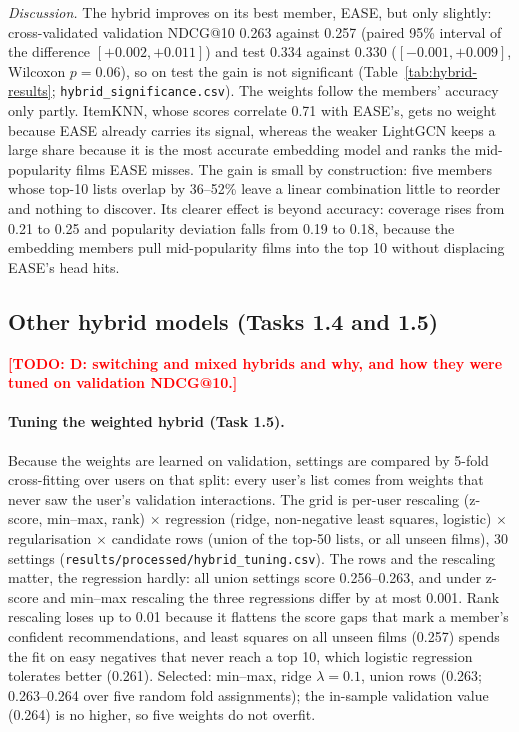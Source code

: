 \documentclass[12pt,a4paper]{article}
\newcommand{\TODO}[1]{\textcolor{red}{\textbf{[TODO: #1]}}}
\newcommand{\owner}[1]{\marginpar{\footnotesize\color{gray}#1}}   %
\begin{document}
\emph{Discussion.} The hybrid improves on its best member, EASE, but only slightly: cross-validated validation
NDCG@10 0.263 against 0.257 (paired 95\% interval of the difference $[+0.002, +0.011]$) and test 0.334 against
0.330 ($[-0.001, +0.009]$, Wilcoxon $p{=}0.06$), so on test the gain is not significant
(Table~\ref{tab:hybrid-results}; \texttt{hybrid\_significance.csv}). The weights follow the members' accuracy only
partly. ItemKNN, whose scores correlate 0.71 with EASE's, gets no weight because EASE already carries its signal,
whereas the weaker LightGCN keeps a large share because it is the most accurate embedding model and ranks the
mid-popularity films EASE misses. The gain is small by construction: five members whose top-10 lists overlap by
36--52\% leave a linear combination little to reorder and nothing to discover. Its clearer effect is beyond
accuracy: coverage rises from 0.21 to 0.25 and popularity deviation falls from 0.19 to 0.18, because the embedding
members pull mid-popularity films into the top 10 without displacing EASE's head hits.

\subsection{Other hybrid models (Tasks 1.4 and 1.5)}\owner{D, C}
\TODO{D: switching and mixed hybrids and why, and how they were tuned on validation NDCG@10.}

\paragraph{Tuning the weighted hybrid (Task 1.5).}
Because the weights are learned on validation, settings are compared by 5-fold cross-fitting over users on that
split: every user's list comes from weights that never saw the user's validation interactions. The grid is
per-user rescaling (z-score, min--max, rank) $\times$ regression (ridge, non-negative least squares, logistic)
$\times$ regularisation $\times$ candidate rows (union of the top-50 lists, or all unseen films), 30 settings
(\texttt{results/processed/hybrid\_tuning.csv}). The rows and the rescaling matter, the regression hardly: all union settings score 0.256--0.263, and under z-score and min--max rescaling the three regressions differ by at most 0.001. Rank rescaling loses up to
0.01 because it flattens the score gaps that mark a member's confident recommendations, and least squares on
all unseen films (0.257) spends the fit on easy negatives that never reach a top 10, which logistic regression
tolerates better (0.261). Selected: min--max, ridge $\lambda{=}0.1$, union rows (0.263; 0.263--0.264 over five random fold assignments); the in-sample validation value (0.264) is no higher, so five weights do not overfit.
\end{document}
